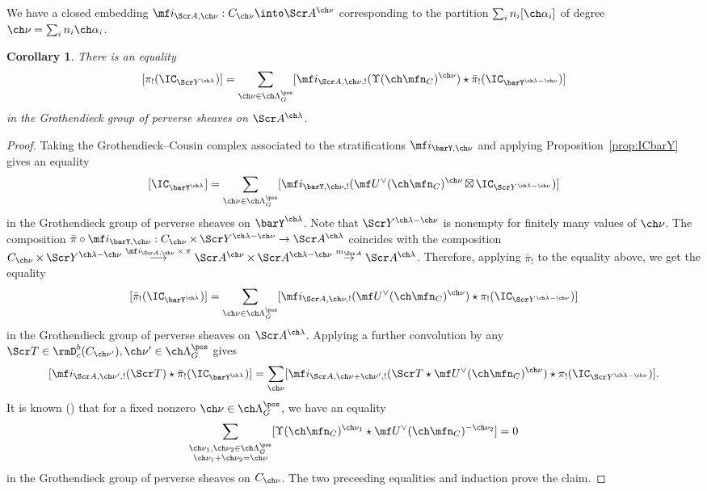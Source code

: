 \documentclass[final]{amsart}
\newtheorem{cor}[subsubsection]{Corollary}
\theoremstyle{remark}
\theoremstyle{definition}
\DeclareMathOperator*{\xt}{\times}
\DeclareMathOperator*{\bt}{\boxtimes}
\numberwithin{equation}{section}
\begin{document}
\subsubsection{}
We have a closed embedding $\mf i_{\Scr A,\ch\nu} : C_{\ch\nu} \into \Scr A^{\ch\nu}$ corresponding to the partition $\sum_i n_i [\ch\alpha_i]$
of degree $\ch\nu = \sum_i n_i\ch\alpha_i$. 


\begin{cor} \label{cor:pibarY}
There is an equality 
\[ [ \pi_!(\IC_{\Scr Y^{\ch\lambda}}) ] = \sum_{\ch\nu\in \ch\Lambda^\pos_G} 
[ \mf i_{\Scr A,\ch\nu,!}(\Upsilon(\ch\mfn_C)^{\ch\nu}) \star \bar\pi_!(\IC_{\barY^{\ch\lambda-\ch\nu}})] \]
in the Grothendieck group of perverse sheaves on $\Scr A^{\ch\lambda}$. 
\end{cor}

\begin{proof}
Taking the Grothendieck--Cousin complex associated to the stratifications
$\mf i_{\barY,\ch\nu}$ and applying Proposition~\ref{prop:ICbarY} 
gives an equality 
\[ [\IC_{\barY^{\ch\lambda}}] = \sum_{\ch\nu \in \ch\Lambda^\pos_G} 
[\mf i_{\barY,\ch\nu,!} ( \mf U^\vee(\ch\mfn_C)^{\ch\nu} \bt \IC_{\Scr Y^{\ch\lambda-\ch\nu}} ) ] \]
in the Grothendieck group of perverse sheaves on $\barY^{\ch\lambda}$.
Note that $\Scr Y^{\ch\lambda-\ch\nu}$ is nonempty for finitely many
values of $\ch\nu$. 
The composition $\bar\pi \circ \mf i_{\barY,\ch\nu} : C_{\ch\nu} \xt \Scr Y^{\ch\lambda-\ch\nu} \to \Scr A^{\ch\lambda}$ coincides with
the composition $C_{\ch\nu} \xt \Scr Y^{\ch\lambda-\ch\nu} \overset{\mf i_{\Scr A,\ch\nu} \xt \pi}\longrightarrow \Scr A^{\ch\nu} \xt \Scr A^{\ch\lambda-\ch\nu} \overset{m_{\Scr A}}\to \Scr A^{\ch\lambda}$.
Therefore, applying $\bar\pi_!$ to the equality above, we get
the equality 
\[ [\bar\pi_!(\IC_{\barY^{\ch\lambda}})] = \sum_{\ch\nu\in \ch\Lambda^\pos_G} [\mf i_{\Scr A,\ch\nu,!}(\mf U^\vee(\ch\mfn_C)^{\ch\nu}) \star \pi_!(\IC_{\Scr Y^{\ch\lambda-\ch\nu}})]  \]
in the Grothendieck group of perverse sheaves on $\Scr A^{\ch\lambda}$.
Applying a further convolution by any $\Scr T \in \rmD^b_c(C_{\ch\nu'}), 
\ch\nu'\in \ch\Lambda^\pos_G$
gives 
\[ [ \mf i_{\Scr A, \ch\nu',!}( \Scr T ) \star \bar\pi_! (\IC_{\barY^{\ch\lambda}}) ] = \sum_{\ch\nu} [ \mf i_{\Scr A,\ch\nu+\ch\nu',!}( \Scr T \star \mf U^\vee(\ch\mfn_C)^{\ch\nu}) \star \pi_!(\IC_{\Scr Y^{\ch\lambda-\ch\nu}}) ] . \]
It is known (\cite[\S 6.4]{BG2}) that for a fixed nonzero $\ch\nu \in \ch\Lambda^\pos_G$, we have an equality 
\[ \sum_{\substack{\ch\nu_1,\ch\nu_2 \in \ch\Lambda^\pos_G\\ 
\ch\nu_1+\ch\nu_2=\ch\nu}} 
[ \Upsilon(\ch\mfn_C)^{\ch\nu_1} \star \mf U^\vee(\ch\mfn_C)^{-\ch\nu_2}  ] = 0 \]
in the Grothendieck group of perverse sheaves on $C_{\ch\nu}$. 
The two preceeding equalities and induction prove the claim.
\end{proof}
\end{document}
